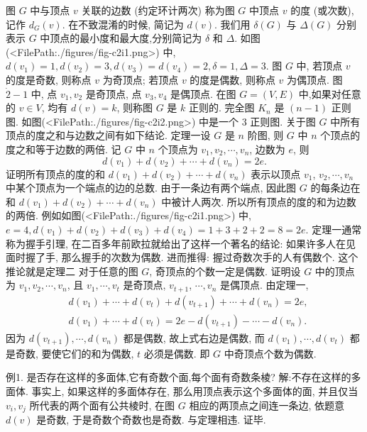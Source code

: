 
图 $G$ 中与顶点 $v$ 关联的边数 (约定环计两次) 称为图 $G$ 中顶点 $v$ 的度 (或次数), 记作 $d_G(v)$. 在不致混淆的时候, 简记为 $d(v)$. 我们用 $\delta(G)$ 与 $\Delta(G)$ 分别表示 $G$ 中顶点的最小度和最大度,分别简记为 $\delta$ 和 $\Delta$.
如图(<FilePath:./figures/fig-c2i1.png>) 中, $d\left(v_1\right)=1, d\left(v_2\right)=3, d\left(v_3\right)=d\left(v_4\right)=2, \delta=1, \Delta=3$.
图 $G$ 中, 若顶点 $v$ 的度是奇数, 则称点 $v$ 为奇顶点; 若顶点 $v$ 的度是偶数, 则称点 $v$ 为偶顶点.
图 $\dot{2}-1$ 中, 点 $v_1, v_2$ 是奇顶点, 点 $v_3, v_4$ 是偶顶点.
在图 $G=(V, E)$ 中,如果对任意的 $v \in V$, 均有 $d(v)=k$, 则称图 $G$ 是 $k$ 正则的.
完全图 $K_n$ 是 $(n-1)$ 正则图.
如图(<FilePath:./figures/fig-c2i2.png>) 中是一个 3 正则图.
关于图 $G$ 中所有顶点的度之和与边数之间有如下结论.
定理一设 $G$ 是 $n$ 阶图, 则 $G$ 中 $n$ 个顶点的度之和等于边数的两倍.
记 $G$ 中 $n$ 个顶点为 $v_1, v_2, \cdots, v_n$, 边数为 $e$, 则
$$
d\left(v_1\right)+d\left(v_2\right)+\cdots+d\left(v_n\right)=2 e .
$$
证明所有顶点的度的和 $d\left(v_1\right)+d\left(v_2\right)+\cdots+d\left(v_n\right)$ 表示以顶点 $v_1$, $v_2, \cdots, v_n$ 中某个顶点为一个端点的边的总数.
由于一条边有两个端点, 因此图 $G$ 的每条边在和 $d\left(v_1\right)+d\left(v_2\right)+\cdots+d\left(v_n\right)$ 中被计人两次.
所以所有顶点的度的和为边数的两倍.
例如如图(<FilePath:./figures/fig-c2i1.png>) 中, $e=4, d\left(v_1\right)+d\left(v_2\right)+d\left(v_3\right)+d\left(v_4\right)=1+3+2+ 2=8=2 e$.
定理一通常称为握手引理, 在二百多年前欧拉就给出了这样一个著名的结论: 如果许多人在见面时握了手, 那么握手的次数为偶数.
进而推得: 握过奇数次手的人有偶数个.
这个推论就是定理二 对于任意的图 $G$, 奇顶点的个数一定是偶数.
证明设 $G$ 中的顶点为 $v_1, v_2, \cdots, v_n$, 且 $v_1, \cdots, v_t$ 是奇顶点, $v_{t+1}$, $\cdots, v_n$ 是偶顶点.
由定理一,
$$
\begin{aligned}
& d\left(v_1\right)+\cdots+d\left(v_t\right)+d\left(v_{t+1}\right)+\cdots+d\left(v_n\right)=2 e, \\
& d\left(v_1\right)+\cdots+d\left(v_t\right)=2 e-d\left(v_{t+1}\right)-\cdots-d\left(v_n\right) .
\end{aligned}
$$
因为 $d\left(v_{t+1}\right), \cdots, d\left(v_n\right)$ 都是偶数, 故上式右边是偶数, 而 $d\left(v_1\right), \cdots, d\left(v_t\right)$ 都是奇数, 要使它们的和为偶数, $t$ 必须是偶数.
即 $G$ 中奇顶点个数为偶数.



例1. 是否存在这样的多面体,它有奇数个面,每个面有奇数条棱?
解:不存在这样的多面体.
事实上, 如果这样的多面体存在, 那么用顶点表示这个多面体的面, 并且仅当 $v_i, v_j$ 所代表的两个面有公共棱时, 在图 $G$ 相应的两顶点之间连一条边, 依题意 $d(v)$ 是奇数, 于是奇数个奇数也是奇数.
与定理相违.
证毕.



